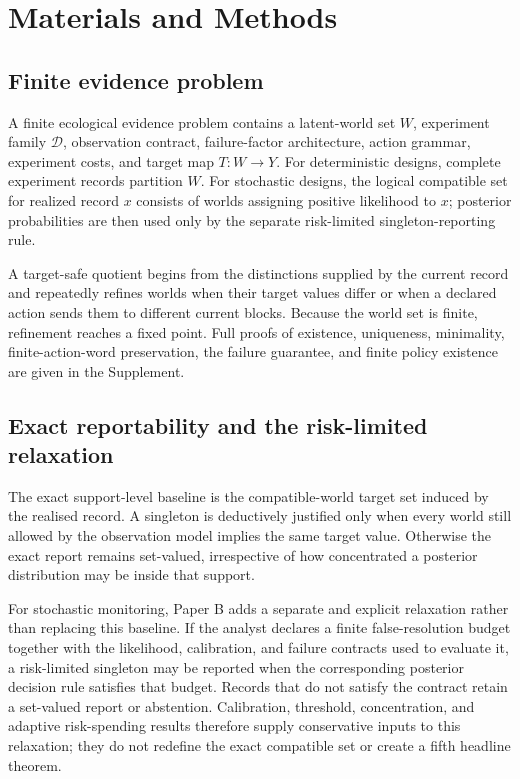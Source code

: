 \documentclass[11pt]{article}
\begin{document}
\section{Materials and Methods}
\subsection{Finite evidence problem}
A finite ecological evidence problem contains a latent-world set $W$, experiment family $\mathcal{D}$, observation contract, failure-factor architecture, action grammar, experiment costs, and target map $T:W\to Y$. For deterministic designs, complete experiment records partition $W$. For stochastic designs, the logical compatible set for realized record $x$ consists of worlds assigning positive likelihood to $x$; posterior probabilities are then used only by the separate risk-limited singleton-reporting rule.

A target-safe quotient begins from the distinctions supplied by the current record and repeatedly refines worlds when their target values differ or when a declared action sends them to different current blocks. Because the world set is finite, refinement reaches a fixed point. Full proofs of existence, uniqueness, minimality, finite-action-word preservation, the failure guarantee, and finite policy existence are given in the Supplement.

\subsection{Exact reportability and the risk-limited relaxation}
The exact support-level baseline is the compatible-world target set induced by the realised record. A singleton is deductively justified only when every world still allowed by the observation model implies the same target value. Otherwise the exact report remains set-valued, irrespective of how concentrated a posterior distribution may be inside that support.

For stochastic monitoring, Paper B adds a separate and explicit relaxation rather than replacing this baseline. If the analyst declares a finite false-resolution budget together with the likelihood, calibration, and failure contracts used to evaluate it, a risk-limited singleton may be reported when the corresponding posterior decision rule satisfies that budget. Records that do not satisfy the contract retain a set-valued report or abstention. Calibration, threshold, concentration, and adaptive risk-spending results therefore supply conservative inputs to this relaxation; they do not redefine the exact compatible set or create a fifth headline theorem.
\end{document}
